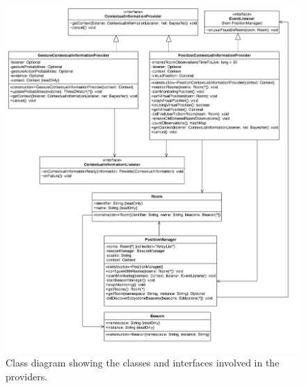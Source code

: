 \begin{figure}[h!]
\centering
\includegraphics[width=\textwidth]{images/uml-context-engine-providers}
\caption{Class diagram showing the classes and interfaces involved in the providers.}
\label{fig:implementation:context-engine:providers}
\end{figure}

